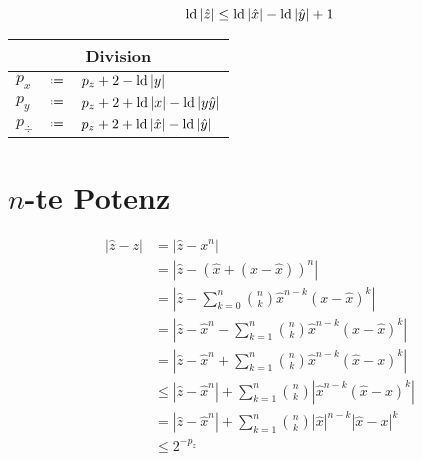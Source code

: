 \begin{equation*}
  \mathop{\rm ld}\nolimits|\hat{z}| \le \mathop{\rm ld}\nolimits|\hat{x}|-\mathop{\rm ld}\nolimits|\hat{y}|+1
\end{equation*}

\begin{algorithm}
\phantom{}
\begin{center}
\renewcommand*{\arraystretch}{1.3}
\begin{tabular}{lcl}
  \hline
  \multicolumn{3}{c}{Division} \\
  \hline
   $p_x$    & $\defeq$ & $p_z+2-\mathop{\rm ld}\nolimits|y|$ \\
   $p_y$    & $\defeq$ & $p_z+2+\mathop{\rm ld}\nolimits|x|-\mathop{\rm ld}\nolimits|y\hat{y}|$ \\
   $p_\div$ & $\defeq$ & $p_z+2+\mathop{\rm ld}\nolimits|\hat{x}|-\mathop{\rm ld}\nolimits|\hat{y}|$ \\
  \hline
\end{tabular}
\end{center}
\end{algorithm}




\section{$n$-te Potenz}

\begin{equation*}
\begin{split}
  |\hat{z}-z| & =  |\hat{z}-x^n| \\
              & =  |\hat{z}-(\hat{x}+(x-\hat{x}))^n| \\
              & =  \left|\hat{z}-\sum_{k=0}^n\binom{n}{k}\hat{x}^{n-k}(x-\hat{x})^k\right| \\
              & =  \left|\hat{z}-\hat{x}^n-\sum_{k=1}^n\binom{n}{k}\hat{x}^{n-k}(x-\hat{x})^k\right| \\
              & =  \left|\hat{z}-\hat{x}^n+\sum_{k=1}^n\binom{n}{k}\hat{x}^{n-k}(\hat{x}-x)^k\right| \\
              &\le |\hat{z}-\hat{x}^n|+\sum_{k=1}^n\binom{n}{k}\left|\hat{x}^{n-k}(\hat{x}-x)^k\right| \\
              & =  |\hat{z}-\hat{x}^n|+\sum_{k=1}^n\binom{n}{k}|\hat{x}|^{n-k}|\hat{x}-x|^k \\
              &\le 2^{-p_z}
\end{split}
\end{equation*}

